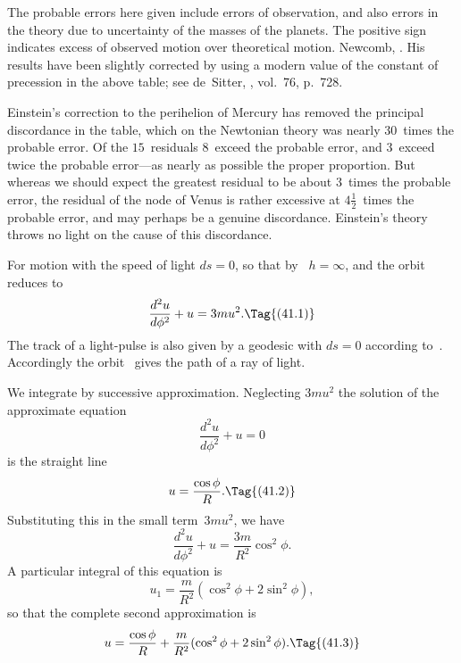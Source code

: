 \documentclass[12pt]{book}
\begin{document}
The probable errors here given include errors of observation, and also errors
in the theory due to uncertainty of the masses of the planets. The positive
sign indicates excess of observed motion over theoretical motion\footnotemark.\footnotetext
  {Newcomb, . His results have been slightly corrected by using a
  modern value of the constant of precession in the above table; see de~Sitter, ,
  vol.~76, p.~728.}

Einstein's correction to the perihelion of Mercury has removed the principal
discordance in the table, which on the Newtonian theory was nearly $30$~times
the probable error. Of the $15$~residuals $8$~exceed the probable error,
and $3$~exceed twice the probable error---as nearly as possible the proper proportion.
But whereas we should expect the greatest residual to be about $3$~times
the probable error, the residual of the node of Venus is rather excessive
at $4\frac{1}{2}$~times the probable error, and may perhaps be a genuine discordance.
Einstein's theory throws no light on the cause of this discordance.

%
%

For motion with the speed of light $ds = 0$, so that by~ $h = \infty$, and
the orbit~ reduces to
\[
\frac{d^{2}u}{d\phi^{2}} + u = 3mu^{2}.
\Tag{(41.1)}
\]
The track of a light-pulse is also given by a geodesic with $ds = 0$ according to~.
Accordingly the orbit~ gives the path of a ray of light.

We integrate by successive approximation. Neglecting $3mu^{2}$ the solution
of the approximate equation
\[
\frac{d^{2}u}{d\phi^{2}} + u = 0
\]
is the straight line
\[
u = \frac{\cos\phi}{R}.
\Tag{(41.2)}
\]
Substituting this in the small term~$3mu^{2}$, we have
\[
\frac{d^{2}u}{d\phi^{2}} + u = \frac{3m}{R^{2}} \cos^{2}\phi.
\]
A particular integral of this equation is
\[
u_{1} = \frac{m}{R^{2}} (\cos^{2}\phi + 2\sin^{2}\phi),
\]
so that the complete second approximation is
\[
u = \frac{\cos\phi}{R} + \frac{m}{R^{2}} (\cos^{2}\phi + 2\sin^{2}\phi).
\Tag{(41.3)}
\]
\end{document}
